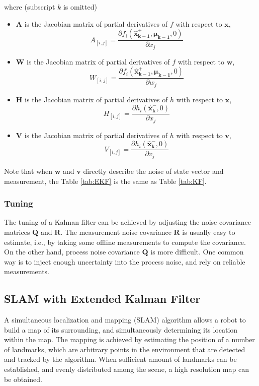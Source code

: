 \noindent where (subscript $k$ is omitted)
\begin{itemize}
  \item $\boldsymbol{A}$ is the Jacobian matrix of partial derivatives of $f$ with
  respect to $\boldsymbol{x}$, $$A_{[i,j]}= \frac{\partial f_i(\boldsymbol{\hat{x}_{k-1}^+},
    \boldsymbol{\mu_{k-1}}, 0)}{\partial x_j}$$
  \item $\boldsymbol{W}$ is the Jacobian matrix of partial derivatives of $f$ with
  respect to $\boldsymbol{w}$, $$W_{[i,j]}= \frac{\partial f_i(\boldsymbol{\hat{x}_{k-1}^+},
    \boldsymbol{\mu_{k-1}}, 0)}{\partial w_j}$$
  \item $\boldsymbol{H}$ is the Jacobian matrix of partial derivatives of $h$ with
  respect to $\boldsymbol{x}$, $$H_{[i,j]}= \frac{\partial h_i(\boldsymbol{\hat{x}_k^-},
    0)}{\partial x_j}$$
  \item $\boldsymbol{V}$ is the Jacobian matrix of partial derivatives of $h$ with
  respect to $\boldsymbol{v}$, $$V_{[i,j]}= \frac{\partial
    h_i(\boldsymbol{\hat{x}_k^-},0)}{\partial v_j}$$
\end{itemize}

\noindent Note that when $\boldsymbol{w}$ and $\boldsymbol{v}$ directly describe the noise of
state vector and measurement, the Table \ref{tab:EKF} is the same as
Table \ref{tab:KF}.

\subsubsection{Tuning}
The tuning of a Kalman filter can be achieved by adjusting the noise
covariance matrices $\boldsymbol{Q}$ and $\boldsymbol{R}$. The
measurement noise covariance $\boldsymbol{R}$ is usually easy to
estimate, i.e., by taking some offline measurements to compute the
covariance. On the other hand, process noise covariance
$\boldsymbol{Q}$ is more difficult. One common way is to inject enough
uncertainty into the process noise, and rely on reliable measurements.
 
\subsection{SLAM with Extended Kalman Filter}
A simultaneous localization and mapping (SLAM) algorithm allows a
robot to build a map of its surrounding, and simultaneously
determining its location within the map. The mapping is achieved by
estimating the position of a number of landmarks, which are arbitrary
points in the environment that are detected and tracked by the
algorithm. When sufficient amount of landmarks can be established, and
evenly distributed among the scene, a high resolution map can be
obtained. 

